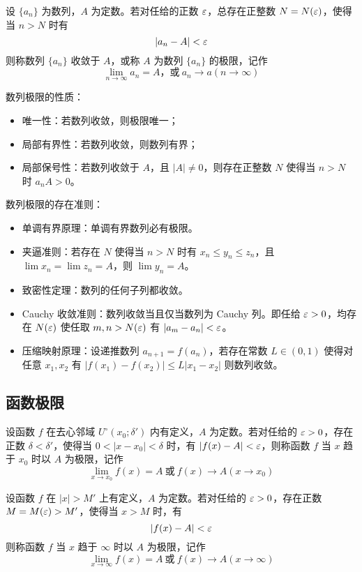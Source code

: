 \begin{definition}
	设 $\{a_n\}$ 为数列，$A$ 为定数。若对任给的正数 $\varepsilon$，总存在正整数 $N=N(\varepsilon)$，使得当 $n>N$ 时有
	\[|a_n - A| < \varepsilon\]
	则称数列 $\{a_n\}$ 收敛于 $A$，或称 $A$ 为数列 $\{a_n\}$ 的极限，记作
	\[\lim\limits_{n\to \infty} a_n = A \text{，或}\ a_n \to a(n \to \infty)\]
\end{definition}

数列极限的性质：

\begin{itemize}
	\item 唯一性：若数列收敛，则极限唯一；
	\item 局部有界性：若数列收敛，则数列有界；
	\item 局部保号性：若数列收敛于 $A$，且 $|A| \neq 0$，则存在正整数 $N$ 使得当 $n > N$ 时 $a_n A > 0$。
\end{itemize}

数列极限的存在准则：

\begin{itemize}
	\item 单调有界原理：单调有界数列必有极限。
	\item 夹逼准则：若存在 $N$ 使得当 $n > N$ 时有 $x_n \leqslant y_n \leqslant z_n$，且 $\lim x_n = \lim z_n = A$，则 $\lim y_n = A$。
	\item 致密性定理：数列的任何子列都收敛。
	\item Cauchy 收敛准则：数列收敛当且仅当数列为 Cauchy 列。即任给 $\varepsilon>0$，均存在 $N(\varepsilon)$ 使任取 $m,n>N(\varepsilon)$ 有 $|a_m-a_n| < \varepsilon$。
	\item 压缩映射原理：设递推数列 $a_{n+1} = f(a_n)$，若存在常数 $L \in (0, 1)$ 使得对任意 $x_1,x_2$ 有 $|f(x_1) - f(x_2)| \leqslant L|x_1-x_2|$ 则数列收敛。
\end{itemize}

\subsection{函数极限}

\begin{definition}
	设函数 $f$ 在去心邻域 $U^\circ(x_0;\delta')$ 内有定义，$A$ 为定数。若对任给的 $\varepsilon>0$，存在正数 $\delta<\delta'$，使得当 $0<|x-x_0|<\delta$ 时，有 $|f(x)-A|<\varepsilon$，则称函数 $f$ 当 $x$ 趋于 $x_0$ 时以 $A$ 为极限，记作
	\[ \lim_{x \to x_0}f(x) = A\ \text{或}\ f(x)\to A(x \to x_0) \]
\end{definition}

\begin{definition}
	设函数 $f$ 在 $|x| > M'$ 上有定义，$A$ 为定数。若对任给的 $\varepsilon>0$，存在正数 $M=M(\varepsilon) > M'$，使得当 $x>M$ 时，有
	\[ |f(x)-A| < \varepsilon \]
	则称函数 $f$ 当 $x$ 趋于 $\infty$ 时以 $A$ 为极限，记作
	\[ \lim_{x \to \infty}f(x) = A\ \text{或}\ f(x) \to A(x \to \infty) \]
\end{definition}

